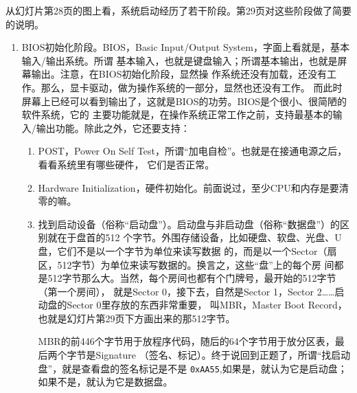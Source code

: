 \documentclass{wx672ctexart}
\newcommand\mpic[1]{%
  \marginpar{\texttt{[image: thumbnails/\#1]}}}
\begin{document}
从幻灯片第28页的图上看，系统启动经历了若干阶段。第29页对这些阶段做了简要的说明。\mpic{pg_0029}
\begin{enumerate}
\item BIOS初始化阶段。BIOS，Basic Input/Output System，字面上看就是，基本输入/输出系统。所谓
基本输入，也就是键盘输入；所谓基本输出，也就是屏幕输出。注意，在BIOS初始化阶段，显然操
作系统还没有加载，还没有工作。那么，显卡驱动，做为操作系统的一部分，显然也还没有工作。
而此时屏幕上已经可以看到输出了，这就是BIOS的功劳。BIOS是个很小、很简陋的软件系统，它的
主要功能就是，在操作系统正常工作之前，支持最基本的输入/输出功能。除此之外，它还要支持：
\begin{enumerate}
\item POST，Power On Self Test，所谓“加电自检”。也就是在接通电源之后，看看系统里有哪些硬件，
它们是否正常。
\item Hardware Initialization，硬件初始化。前面说过，至少CPU和内存是要清零的嘛。
\item 找到启动设备（俗称“启动盘”）。启动盘与非启动盘（俗称“数据盘”）的区别就在于盘首的512
个字节。外围存储设备，比如硬盘、软盘、光盘、U盘，它们不是以一个字节为单位来读写数据
的，而是以一个Sector（扇区，512字节）为单位来读写数据的。换言之，这些“盘”上的每个房
间都是512字节那么大。当然，每个房间也都有个门牌号，最开始的512字节（第一个房间），
就是Sector 0，接下去，自然是Sector 1，Sector 2……启动盘的Sector 0里存放的东西非常重要，
叫MBR，Master Boot Record，也就是幻灯片第29页下方画出来的那512字节。

MBR的前446个字节用于放程序代码，随后的64个字节用于放分区表，最后两个字节是Signature
（签名、标记）。终于说回到正题了，所谓“找启动盘”，就是查看盘的签名标记是不是
\texttt{0xAA55},如果是，就认为它是启动盘；如果不是，就认为它是数据盘。


\end{enumerate}
\end{enumerate}
\end{document}
